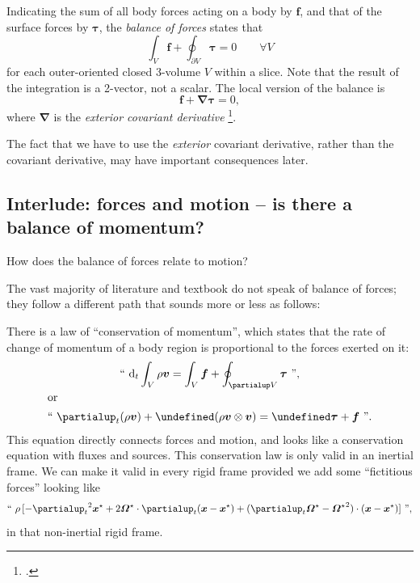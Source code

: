 \documentclass[\ifafour a4paper,12pt,\else a5paper,10pt,\fi%
onecolumn,oneside,article,%
british%
]{memoir}
\theoremstyle{remark}
\theoremstyle{innote}
\newcommand*{\citep}{\footcites}%
\newcommand*{\de}{\partialup}%
\newcommand*{\di}{\mathrm{d}}%
\renewcommand*{\|}{\nonscript\,\vert\nonscript\;\mathopen{}}
\newcommand*{\sect}{\S}%
\let\div\undefined
\DeclareMathOperator{\div}{div}
\newcommand*{\ydd}{\rho}
\newcommand*{\yd}{\ydd}
\newcommand*{\yTT}{\tau}
\newcommand*{\yT}{\bm{\yTT}}
\newcommand*{\ybb}{f}
\newcommand*{\yb}{\bm{\ybb}}
\newcommand*{\yxxt}{x}
\newcommand*{\yxt}{\bm{\yxxt}}
\newcommand*{\yxto}{\bm{\yxxt}^{\mathord{\star}}}
\newcommand*{\yvvt}{v}
\newcommand*{\yvt}{\bm{\yvvt}}
\newcommand*{\yomm}{\varOmega}
\newcommand*{\yom}{\bm{\yomm}^{\mathord{\star}}}
\newcommand*{\yDi}{\bm{\nabla}}
\newcommand*{\yvo}{V}
\begin{document}
Indicating the sum of all body forces acting on a body by $\yb$, and that
of the surface forces by $\yT$, the \emph{balance of forces} states that
\begin{equation}
  \label{eq:force_balance_integral}
  \int_{\yvo} \yb + \oint_{\de\yvo} \yT = 0 \qquad\forall \yvo
\end{equation}
for each outer-oriented closed 3-volume $\yvo$ within a slice. Note that the
result of the integration is a 2-vector, not a scalar. The local version of
the balance is
\begin{equation}
  \label{eq:force_balance_ecd_local}
  \yb + \yDi \yT = 0, 
\end{equation}
where $\yDi$ is the \emph{exterior covariant derivative}
\citep[\sect~Vbis.A.4]{choquetbruhatetal1977_r1996}[\sect~14.5]{misneretal1970_r1973}[\sect~9.3]{frankel1997_r2012}[see
also][]{segev2000,segev2000b,segevetal2000,segev2002,segevetal2012,kansoetal2007}.

The fact that we have to use the \emph{exterior} covariant derivative, rather than
the covariant derivative, may have important consequences later.

\subsection{Interlude: forces and motion -- is there a balance of
  momentum?}
\label{sec:really_balance_momentum}

How does the balance of forces relate to motion?

The vast majority of literature and textbook do not speak of balance of
forces; they follow a different path that sounds more or less as follows:

There is a law of \enquote{conservation of momentum}, which states that the
rate of change of momentum of a body region is proportional to the forces
exerted on it:
\begin{subequations}\label{eq:conservation_momentum_traditional}
  \begin{gather}
    \label{eq:conservation_momentum_traditional_integral}
    \text{\textquotedblleft}\ 
    \di_t\int_{\yvo}\yd\yvt = \int_{\yvo} \yb + \oint_{\de\yvo} \yT
    \ \text{\textquotedblright},
    \\\shortintertext{or}
    \label{eq:conservation_momentum_traditional_differential}
    \text{\textquotedblleft}\ 
    \de_t(\yd\yvt) + \div(\yd\yvt\otimes\yvt) = \div\yT +\yb
    \ \text{\textquotedblright}.
  \end{gather}
\end{subequations}
This equation directly connects forces and motion, and looks like a
conservation equation with fluxes and sources. This conservation law is
only valid in an inertial frame. We can make it valid in every rigid frame
provided we add some \enquote{fictitious forces} looking like
\begin{equation}
  \label{eq:fictitious_forces}
    \text{\textquotedblleft}\ 
  \yd\, [-{\de_t}^2\yxto%
  + 2\yom\cdot\de_t(\yxt-\yxto) + (\de_t\yom-{\yom}^2)\cdot(\yxt-\yxto)]
    \ \text{\textquotedblright},
\end{equation}
in that non-inertial rigid frame.
\end{document}

